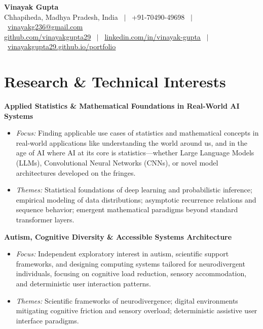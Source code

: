 \documentclass[10pt,a4paper]{article}
\begin{document}
\color{textdark}

\begin{center}
  {\huge \textbf{\color{primary} Vinayak Gupta}} \\[6pt]
  \normalsize
  Chhapiheda, Madhya Pradesh, India \ $\vert$ \
  +91-70490-49698 \ $\vert$ \
  \href{mailto:vinayakg236@gmail.com}{\underline{vinayakg236@gmail.com}} \\[3pt]
  \small
  \href{https://github.com/vinayakgupta29}{\underline{github.com/vinayakgupta29}} \ $\vert$ \
  \href{https://linkedin.com/in/vinayak-gupta-70a808202}{\underline{linkedin.com/in/vinayak-gupta}} \ $\vert$ \
  \href{https://vinayakgupta29.github.io/portfolio}{\underline{vinayakgupta29.github.io/portfolio}}
\end{center}
\vspace{2pt}

\section*{Research \& Technical Interests}

\textbf{Applied Statistics \& Mathematical Foundations in Real-World AI Systems}
\begin{itemize}
  \item \textit{Focus:} Finding applicable use cases of statistics and mathematical concepts in real-world applications like understanding the world around us, and in the age of AI where AI at its core is statistics---whether Large Language Models (LLMs), Convolutional Neural Networks (CNNs), or novel model architectures developed on the fringes.
  \item \textit{Themes:} Statistical foundations of deep learning and probabilistic inference; empirical modeling of data distributions; asymptotic recurrence relations and sequence behavior; emergent mathematical paradigms beyond standard transformer layers.
\end{itemize}

\vspace{3pt}
\textbf{Autism, Cognitive Diversity \& Accessible Systems Architecture}
\begin{itemize}
  \item \textit{Focus:} Independent exploratory interest in autism, scientific support frameworks, and designing computing systems tailored for neurodivergent individuals, focusing on cognitive load reduction, sensory accommodation, and deterministic user interaction patterns.
  \item \textit{Themes:} Scientific frameworks of neurodivergence; digital environments mitigating cognitive friction and sensory overload; deterministic assistive user interface paradigms.
\end{itemize}
\end{document}
